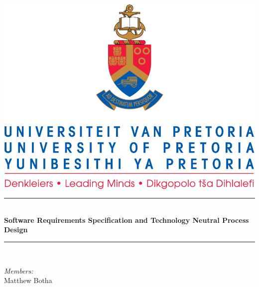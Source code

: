 \documentclass{article}
\begin{document}
	
\begin{titlepage}
	\newcommand{\HRule}{\rule{\linewidth}{0.5mm}} %

	\center %
	 

	\includegraphics[width=\textwidth]{front-page}


	\HRule \\[0.4cm]
	{ \huge \bfseries Software Requirements Specification
	and
	Technology Neutral Process Design}\\[0.4cm] %
	\HRule \\[1.5cm]
	 

	\begin{minipage}{0.5\textwidth}
	\begin{flushleft} \large
	\emph{Members:}\\%
	Matthew Botha


\end{flushleft}
\end{minipage}
\end{titlepage}
\end{document}
